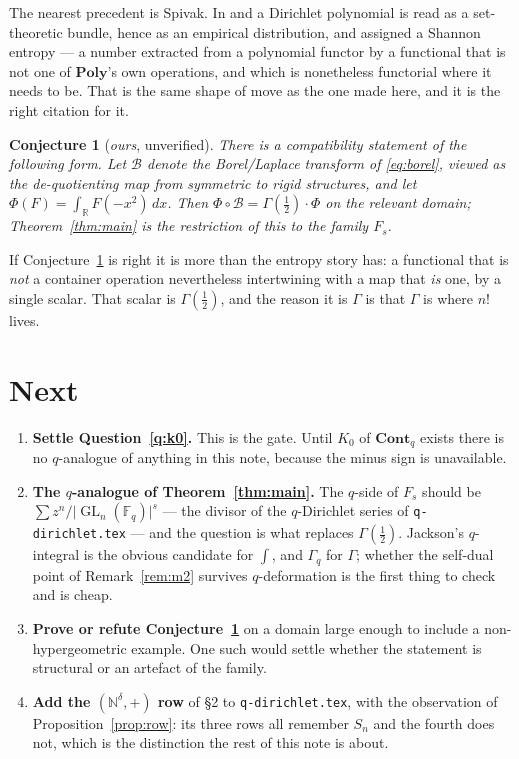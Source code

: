 \documentclass[11pt,a4paper]{article}
\newtheorem{conjecture}[theorem]{Conjecture}
\theoremstyle{definition}
\theoremstyle{remark}
\newcommand{\FF}{\mathbb{F}}
\newcommand{\NN}{\mathbb{N}}
\newcommand{\RR}{\mathbb{R}}
\newcommand{\cat}[1]{\mathbf{#1}}
\newcommand{\Poly}{\cat{Poly}}
\newcommand{\Cont}{\cat{Cont}}
\newcommand{\norm}[1]{\lvert #1 \rvert}
\DeclareMathOperator{\GL}{GL}
\begin{document}
The nearest precedent is Spivak. In \cite{SpivakEntropy} and
\cite{HosgoodSpivak} a Dirichlet polynomial is read as a set-theoretic bundle, hence
as an empirical distribution, and assigned a Shannon entropy --- a number extracted
from a polynomial functor by a functional that is not one of $\Poly$'s own
operations, and which is nonetheless functorial where it needs to be. That is the
same shape of move as the one made here, and it is the right citation for it.

\begin{conjecture}[\emph{ours}, unverified]\label{conj:compat}
There is a compatibility statement of the following form. Let $\mathcal{B}$ denote
the Borel/Laplace transform of \eqref{eq:borel}, viewed as the de-quotienting map
from symmetric to rigid structures, and let
$\Phi(F) = \int_\RR F(-x^2)\,dx$. Then
$\Phi \circ \mathcal{B} = \Gamma(\tfrac12)\cdot\Phi$ on the relevant
domain; Theorem~\ref{thm:main} is the restriction of this to the family $F_s$.
\end{conjecture}

If Conjecture~\ref{conj:compat} is right it is more than the entropy story has: a
functional that is \emph{not} a container operation nevertheless intertwining with a
map that \emph{is} one, by a single scalar. That scalar is $\Gamma(\tfrac12)$, and
the reason it is $\Gamma$ is that $\Gamma$ is where $n!$ lives.

\section{Next}

\begin{enumerate}[nosep]
  \item \textbf{Settle Question~\ref{q:k0}.} This is the gate. Until $K_0$ of
        $\Cont_q$ exists there is no $q$-analogue of anything in this note, because
        the minus sign is unavailable.
  \item \textbf{The $q$-analogue of Theorem~\ref{thm:main}.} The $q$-side of
        $F_s$ should be $\sum z^n/\norm{\GL_n(\FF_q)}^s$ --- the divisor of the
        $q$-Dirichlet series of \texttt{q-dirichlet.tex} --- and the question is
        what replaces $\Gamma(\tfrac12)$. Jackson's $q$-integral is the obvious
        candidate for $\int$, and $\Gamma_q$ for $\Gamma$; whether the self-dual
        point of Remark~\ref{rem:m2} survives $q$-deformation is the first thing
        to check and is cheap.
  \item \textbf{Prove or refute Conjecture~\ref{conj:compat}} on a domain large
        enough to include a non-hypergeometric example. One such would settle
        whether the statement is structural or an artefact of the family.
  \item \textbf{Add the $(\NN^\delta,+)$ row} of \S2 to
        \texttt{q-dirichlet.tex}, with the observation of
        Proposition~\ref{prop:row}: its three rows all remember $S_n$ and the
        fourth does not, which is the distinction the rest of this note is about.
\end{enumerate}
\end{document}
